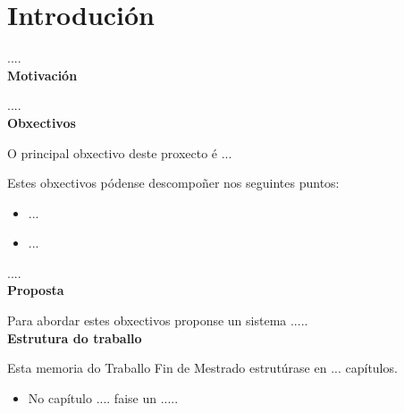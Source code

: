 %
%

\chapter[Introdución]{
	Introdución
	\label{ch.ntr}
}

....\\

\textbf{Motivación}

....\\

\textbf{Obxectivos}

O principal obxectivo deste proxecto é ...

Estes obxectivos pódense descompoñer nos seguintes puntos:
\begin{itemize}
	\item ...
	
	\item ...
	
	
\end{itemize}

....\\

\textbf{Proposta}

Para abordar estes obxectivos proponse un sistema .....\\

\textbf{Estrutura do traballo}

Esta memoria do Traballo Fin de Mestrado estrutúrase en ... capítulos.

\begin{itemize}
	\item No capítulo .... faise un .....

\end{itemize}
